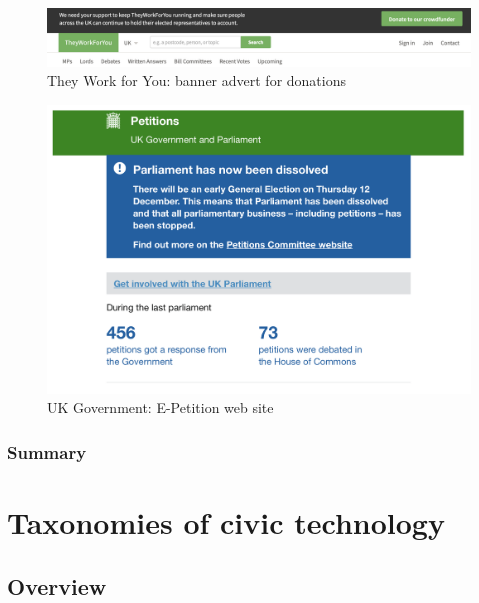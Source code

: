 \documentclass{article}
\begin{document}
			\begin{figure}
				\includegraphics[scale=0.4]{images/they-work-for-you-challenges-finance}
				\caption{They Work for You: banner advert for donations}
				\label{fig:they-work-for-you-challenges-finance}
			\end{figure}
			
			\begin{figure}
				\centering
				\includegraphics[scale=0.4]{images/e-petition-site}
				\caption{UK Government: E-Petition web site}
				\label{fig:e-petition-site}
			\end{figure}
						
        	\subsubsection*{Summary}
        	
        	
        	 
\section*{Taxonomies of civic technology}

        \subsection*{Overview}
        
        
\end{document}
